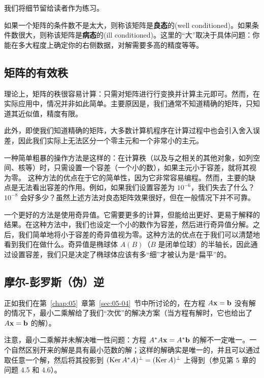 我们将细节留给读者作为练习。

如果一个矩阵的条件数不是太大，则称该矩阵是\textbf{良态}的(well conditioned)。如果条件数很大，则称该矩阵是\textbf{病态}的(ill conditioned)。这里的“大”取决于具体问题：你能在多大程度上确定你的右侧数据，对解需要多高的精度等等。

\subsection{矩阵的有效秩}\label{sec:06-04-04}

理论上，矩阵的秩很容易计算：只需对矩阵进行行变换并计算主元即可。然而，在实际应用中，情况并非如此简单。主要原因是，我们通常不知道精确的矩阵，只知道其近似值，精度有限。

此外，即使我们知道精确的矩阵，大多数计算机程序在计算过程中也会引入舍入误差，因此我们实际上无法区分一个零主元和一个非常小的主元。

一种简单粗暴的操作方法是这样的：在计算秩（以及与之相关的其他对象，如列空间、核等）时，只需设置一个容差（一个小的数），如果主元小于容差，就将其视为零。
这种方法的优点在于它的简单性，因为它非常容易编程。然而，主要的缺点是无法看出容差的作用。例如，如果我们设置容差为 $10^{-6}$，我们失去了什么？$10^{-8}$ 会好多少？虽然上述方法对良态矩阵效果很好，但在一般情况下并不可靠。

一个更好的方法是使用奇异值。它需要更多的计算，但能给出更好、更易于解释的结果。在这种方法中，我们也设定一个小的数作为容差，然后进行奇异值分解。之后，我们简单地将小于容差的奇异值视为零。这种方法的优点在于我们可以清楚地看到我们在做什么。奇异值是椭球体 $A(B)$（$B$ 是闭单位球）的半轴长，因此通过设置容差，我们只是决定了椭球体应该有多“细”才被认为是“扁平”的。

\subsection{摩尔-彭罗斯（伪）逆}\label{sec:06-04-05}

正如我们在第~\ref{chap:05}~章第~\ref{sec:05-04}~节中所讨论的，在方程 $A\mathbf{x} = \mathbf{b}$ 没有解的情况下，最小二乘解给了我们“次优”的解决方案（当方程有解时，它也给出了 $A\mathbf{x} = \mathbf{b}$ 的解）。

注意，最小二乘解并未解决唯一性问题：方程 $A^*A\mathbf{x} = A^*\mathbf{b}$ 的解不一定唯一。一个自然区别开来的解是具有最小范数的解；这样的解确实是唯一的，并且可以通过取任意一个解，然后将其投影到 $(\operatorname{Ker} A^*A)^\perp = (\operatorname{Ker} A)^\perp$ 上得到（参见第 5 章的问题 4.5 和 4.6）。

